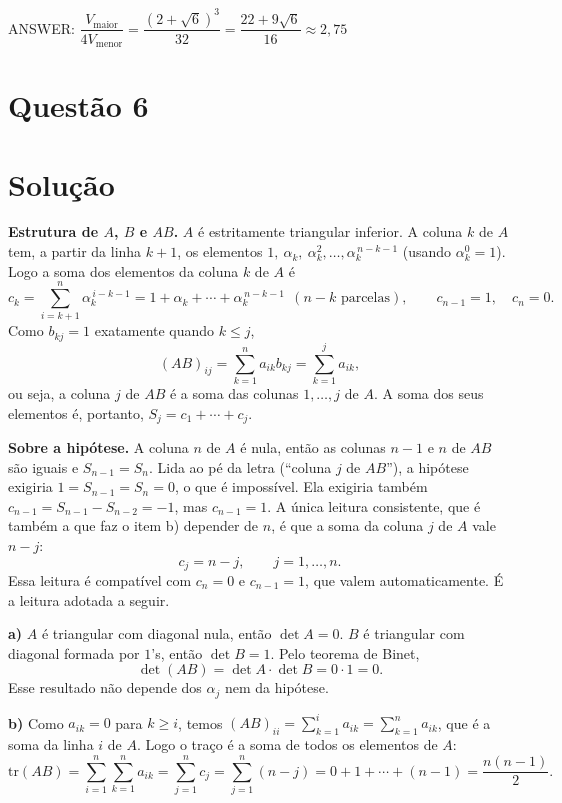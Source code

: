 \documentclass{article}%
\begin{document}
ANSWER: $\dfrac{V_{\text{maior}}}{4V_{\text{menor}}} = \dfrac{(2+\sqrt6)^3}{32} = \dfrac{22+9\sqrt6}{16} \approx 2{,}75$%
\newpage%
\section*{Questão 6}

\section*{Solução}

\textbf{Estrutura de $A$, $B$ e $AB$.} $A$ é estritamente triangular inferior. A coluna $k$ de $A$ tem, a partir da linha $k+1$, os elementos $1,\ \alpha_k,\ \alpha_k^2,\dots,\alpha_k^{\,n-k-1}$ (usando $\alpha_k^0=1$). Logo a soma dos elementos da coluna $k$ de $A$ é
\[
c_k=\sum_{i=k+1}^{n}\alpha_k^{\,i-k-1}=1+\alpha_k+\cdots+\alpha_k^{\,n-k-1}\ \ (n-k \text{ parcelas}),\qquad c_{n-1}=1,\quad c_n=0 .
\]
Como $b_{kj}=1$ exatamente quando $k\le j$,
\[
(AB)_{ij}=\sum_{k=1}^{n}a_{ik}b_{kj}=\sum_{k=1}^{j}a_{ik},
\]
ou seja, a coluna $j$ de $AB$ é a soma das colunas $1,\dots,j$ de $A$. A soma dos seus elementos é, portanto, $S_j=c_1+\cdots+c_j$.

\textbf{Sobre a hipótese.} A coluna $n$ de $A$ é nula, então as colunas $n-1$ e $n$ de $AB$ são iguais e $S_{n-1}=S_n$. Lida ao pé da letra (``coluna $j$ de $AB$''), a hipótese exigiria $1=S_{n-1}=S_n=0$, o que é impossível. Ela exigiria também $c_{n-1}=S_{n-1}-S_{n-2}=-1$, mas $c_{n-1}=1$. A única leitura consistente, que é também a que faz o item b) depender de $n$, é que a soma da coluna $j$ de $A$ vale $n-j$:
\[
c_j=n-j,\qquad j=1,\dots,n .
\]
Essa leitura é compatível com $c_n=0$ e $c_{n-1}=1$, que valem automaticamente. É a leitura adotada a seguir.

\textbf{a)} $A$ é triangular com diagonal nula, então $\det A=0$. $B$ é triangular com diagonal formada por $1$'s, então $\det B=1$. Pelo teorema de Binet,
\[
\det(AB)=\det A\cdot\det B=0\cdot 1=0 .
\]
Esse resultado não depende dos $\alpha_j$ nem da hipótese.

\textbf{b)} Como $a_{ik}=0$ para $k\ge i$, temos $(AB)_{ii}=\sum_{k=1}^{i}a_{ik}=\sum_{k=1}^{n}a_{ik}$, que é a soma da linha $i$ de $A$. Logo o traço é a soma de todos os elementos de $A$:
\[
\mathrm{tr}(AB)=\sum_{i=1}^{n}\sum_{k=1}^{n}a_{ik}=\sum_{j=1}^{n}c_j=\sum_{j=1}^{n}(n-j)=0+1+\cdots+(n-1)=\frac{n(n-1)}{2}.
\]
\end{document}
